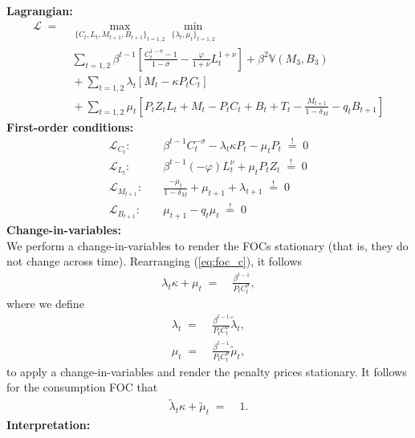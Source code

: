 \documentclass[a4paper, 12pt]{article}
\begin{document}
\begin{Answer}%
	\textbf{Lagrangian:}%
	\begin{align*}%
		\mathcal{L} \; = & \; \underset{\{C_t, L_t, M_{t+1}, B_{t+1}\}_{t=1,2}}{\max} \underset{\{\lambda_t, \mu_t\}_{t=1,2}}{\min}\\%
		& \; \sum_{t=1,2} \beta^{t-1} \left[ \frac{C_t^{1-\sigma}-1}{1-\sigma} - \frac{\varphi}{1+\nu} L_t^{1+\nu} \right] + \beta^2 \mathbb{V} \left(M_3,B_3\right)\\%
		& \; + \sum_{t=1,2} \lambda_t \left[ M_t - \kappa P_t C_t \right]\\%
		& \; + \sum_{t=1,2} \mu_t \left[ P_t Z_t L_t + M_t - P_t C_t + B_t + T_t - \frac{M_{t+1}}{1-\delta_M} - q_t B_{t+1} \right]%
	\end{align*}%
	\textbf{First-order conditions:}%
	\begin{align}%
		\mathcal{L}_{C_t}: \quad & \beta^{t-1} C_t^{-\sigma} - \lambda_t \kappa P_t - \mu_t P_t \; \overset{!}{=} \; 0\label{eq:foc_c}\\%
		\mathcal{L}_{L_t}: \quad & \beta^{t-1} (-\varphi) L_t^\nu + \mu_t P_t Z_t \; \overset{!}{=} \; 0\label{eq:foc_l}\\%
		\mathcal{L}_{M_{t+1}}: \quad & \frac{- \mu_t}{1-\delta_M} + \mu_{t+1} + \lambda_{t+1} \; \overset{!}{=} \; 0\label{eq:foc_m}\\%
		\mathcal{L}_{B_{t+1}}: \quad & \mu_{t+1} - q_t \mu_t \; \overset{!}{=} \; 0\label{eq:foc_b}%
	\end{align}%
	\textbf{Change-in-variables:}\\%
	We perform a change-in-variables to render the FOCs stationary (that is, they do not change across time). Rearranging (\ref{eq:foc_c}), it follows%
	\begin{align*}%
		\lambda_t \kappa + \mu_t \; = & \; \frac{\beta^{t-1}}{P_t C_t^\sigma},%
	\end{align*}%
	where we define%
	\begin{align}%
		\lambda_t \; = & \; \frac{\beta^{t-1}}{P_t C_t^\sigma} \tilde{\lambda}_t,\\%
		\mu_t \; = & \; \frac{\beta^{t-1}}{P_t C_t^\sigma} \tilde{\mu}_t,%
	\end{align}%
	to apply a change-in-variables and render the penalty prices stationary. It follows for the consumption FOC that%
	\begin{align}%
		\tilde{\lambda}_t \kappa + \tilde{\mu}_t \; = & \; 1.\label{eq:consumption_civ}%
	\end{align}%
	\textbf{Interpretation:}\\%

\end{Answer}
\end{document}
